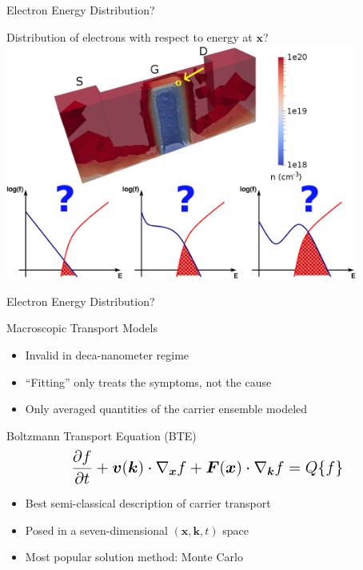 \documentclass[usepdftitle=false,10pt]{beamer}
\renewcommand{\vector}[1]{\boldsymbol{#1}}
\begin{document}
\begin{frame} {Electron Energy Distribution?} 
 \begin{center}Distribution of electrons with respect to energy at $\vector x$? \\ 
  \includegraphics[width=0.87\textwidth]{trigate-electrons-edf-3}
 \end{center} 
\end{frame} 
 

\begin{frame} {Electron Energy Distribution?} 
 
  \begin{block}{Macroscopic Transport Models} 
    \begin{itemize} 
     \item Invalid in deca-nanometer regime 
     \item ``Fitting'' only treats the symptoms, not the cause 
     \item Only averaged quantities of the carrier ensemble modeled 
    \end{itemize} 
  \end{block} 
 
  \vspace*{0.5cm}
  \begin{block}{Boltzmann Transport Equation (BTE)} 
    \begin{align*} \Large 
      \frac{\partial f}{\partial t} +  \vector v(\vector k) \cdot \nabla_{\vector x} f + \vector F(\vector x) \cdot \nabla_{\vector k} f = Q\{f\}  
    \end{align*} 
  \vspace*{0.1cm}
 
    \begin{itemize} 
      \item Best semi-classical description of carrier transport 
      \item Posed in a seven-dimensional $(\vector x, \vector k, t)$ space 
      \item Most popular solution method: Monte Carlo 
    \end{itemize} 
  \end{block} 
  \vspace*{0.5cm}
\end{frame} 
 
\end{document}
